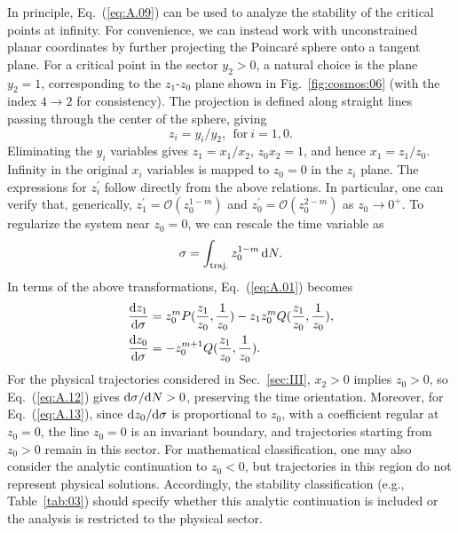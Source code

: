 \documentclass[aps,prd,twocolumn]{revtex4-2}
\newcommand\dx{{\rm d}}
\begin{document}
In principle, Eq.~(\ref{eq:A.09}) can be used to analyze the stability of the critical points at infinity. For convenience, we can instead work with unconstrained planar coordinates by further projecting the Poincar\'e sphere onto a tangent plane. For a critical point in the sector $y_2>0$, a natural choice is the plane $y_2=1$, corresponding to the $z_1$-$z_0$ plane shown in Fig.~\ref{fig:cosmos:06} (with the index $4\rightarrow2$ for consistency). The projection is defined along straight lines passing through the center of the sphere, giving
\begin{equation}
  z_i = y_i/y_2, \mathrm{\ \ for\ }  i=1,0.
\end{equation}
Eliminating the $y_i$ variables gives $z_1=x_1/x_2$, $z_0x_2=1$, and hence $x_1=z_1/z_0$. Infinity in the original $x_i$ variables is mapped to $z_0=0$ in the $z_i$ plane. The expressions for $z_i^\prime$ follow directly from the above relations. In particular, one can verify that, generically, $z_1^\prime=\mathcal{O}(z_0^{1-m})$ and $z_0^\prime=\mathcal{O}(z_0^{2-m})$ as $z_0\rightarrow0^{+}$. To regularize the system near $z_0=0$, we can rescale the time variable as \cite{Meiss2007.book,newsigma}
\begin{equation}\label{eq:A.12}
  \sigma = \int_{\mathrm{traj.}} z_0^{1-m}\, \dx N.
\end{equation}
In terms of the above transformations, Eq.~(\ref{eq:A.01}) becomes
\begin{equation}\label{eq:A.13}
\begin{aligned}
  \frac{\dx z_1}{\dx\sigma} &= z_0^m P(\frac{z_1}{z_0},\frac{1}{z_0}) - z_1z_0^m Q(\frac{z_1}{z_0},\frac{1}{z_0}), \\
  \frac{\dx z_0}{\dx\sigma} &= - z_0^{m+1} Q(\frac{z_1}{z_0},\frac{1}{z_0}).
\end{aligned}
\end{equation}
For the physical trajectories considered in Sec.~\ref{sec:III}, $x_2>0$ implies $z_0>0$, so Eq.~(\ref{eq:A.12}) gives $\dx\sigma/\dx N>0$, preserving the time orientation. Moreover, for Eq.~(\ref{eq:A.13}), since $\dx z_0/\dx\sigma$ is proportional to $z_0$, with a coefficient regular at $z_0=0$, the line $z_0=0$ is an invariant boundary, and trajectories starting from $z_0>0$ remain in this sector. For mathematical classification, one may also consider the analytic continuation to $z_0<0$, but trajectories in this region do not represent physical solutions. Accordingly, the stability classification (e.g., Table~\ref{tab:03}) should specify whether this analytic continuation is included or the analysis is restricted to the physical sector.


%
%

\end{document}
